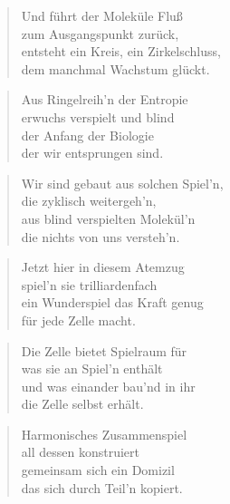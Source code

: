 \documentclass[10pt,a4paper]{article}
\begin{document}
\begin{multicols}{2}
\begin{verse}
Und führt der Moleküle Fluß \\
zum Ausgangspunkt zurück, \\
entsteht ein Kreis, ein Zirkelschluss, \\
dem manchmal Wachstum glückt. \\
\end{verse}

\begin{verse}
Aus Ringelreih’n der Entropie \\
erwuchs verspielt und blind \\
der Anfang der Biologie \\
der wir entsprungen sind. \\
\end{verse}

\begin{verse}
Wir sind gebaut aus solchen Spiel’n, \\
die zyklisch weitergeh’n, \\
aus blind verspielten Molekül’n \\
die nichts von uns versteh’n. \\
\end{verse}

\begin{verse}
Jetzt hier in diesem Atemzug \\
spiel’n sie trilliardenfach \\
ein Wunderspiel das Kraft genug \\
für jede Zelle macht. \\
\end{verse}

\begin{verse}
Die Zelle bietet Spielraum für \\
was sie an Spiel’n enthält \\
und was einander bau’nd in ihr \\
die Zelle selbst erhält. \\
\end{verse}

\begin{verse}
Harmonisches Zusammenspiel \\
all dessen konstruiert \\
gemeinsam sich ein Domizil \\
das sich durch Teil’n kopiert. \\
\end{verse}


\end{multicols}
\end{document}
